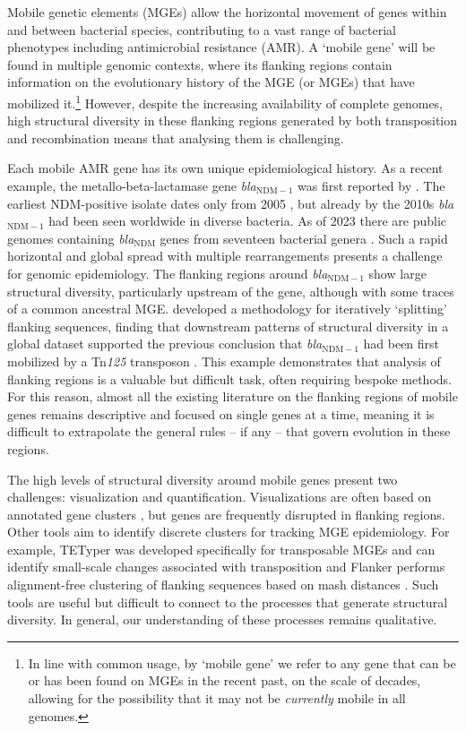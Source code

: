 \documentclass[rmp,superscriptaddress,11pt]{revtex4-1}
\newcommand{\bla}[1]{\textit{bla}$_\mathrm{#1}$}
\begin{document}
\noindent Mobile genetic elements (MGEs) allow the horizontal movement of genes within and between bacterial species, contributing to a vast range of bacterial phenotypes including antimicrobial resistance (AMR). A `mobile gene' will be found in multiple genomic contexts, where its flanking regions contain information on the evolutionary history of the MGE (or MGEs) that have mobilized it.\footnote{In line with common usage, by `mobile gene' we refer to any gene that can be or has been found on MGEs in the recent past, on the scale of decades, allowing for the possibility that it may not be \textit{currently} mobile in all genomes.} However, despite the increasing availability of complete genomes, high structural diversity in these flanking regions generated by both transposition and recombination means that analysing them is challenging. \par

Each mobile AMR gene has its own unique epidemiological history. As a recent example, the metallo-beta-lactamase gene \bla{NDM-1} was first reported by \textcite{Yong2009}. The earliest NDM-positive isolate dates only from 2005 \cite{Jones2014}, but already by the 2010s \bla{NDM-1} had been seen worldwide in diverse bacteria. As of 2023 there are public genomes containing \bla{NDM} genes from seventeen bacterial genera \cite{Alcock2023}. Such a rapid horizontal and global spread with multiple rearrangements presents a challenge for genomic epidemiology. The flanking regions around \bla{NDM-1} show large structural diversity, particularly upstream of the gene, although with some traces of a common ancestral MGE. \textcite{Acman2022} developed a methodology for iteratively `splitting' flanking sequences, finding that downstream patterns of structural diversity in a global dataset supported the previous conclusion that \bla{NDM-1} had been first mobilized by a Tn\textit{125} transposon \cite{Toleman2012}. This example demonstrates that analysis of flanking regions is a valuable but difficult task, often requiring bespoke methods. For this reason, almost all the existing literature on the flanking regions of mobile genes remains descriptive and focused on single genes at a time, meaning it is difficult to extrapolate the general rules {--} if any {--} that govern evolution in these regions. \par

The high levels of structural diversity around mobile genes present two challenges: visualization and quantification. Visualizations are often based on annotated gene clusters \cite{Gilchrist2021}, but genes are frequently disrupted in flanking regions. Other tools aim to identify discrete clusters for tracking MGE epidemiology. For example, TETyper was developed specifically for transposable MGEs and can identify small-scale changes associated with transposition \cite{Sheppard2018} and Flanker performs alignment-free clustering of flanking sequences based on mash distances \cite{Matlock2021}. Such tools are useful but difficult to connect to the processes that generate structural diversity. In general, our understanding of these processes remains qualitative.\par
\end{document}
